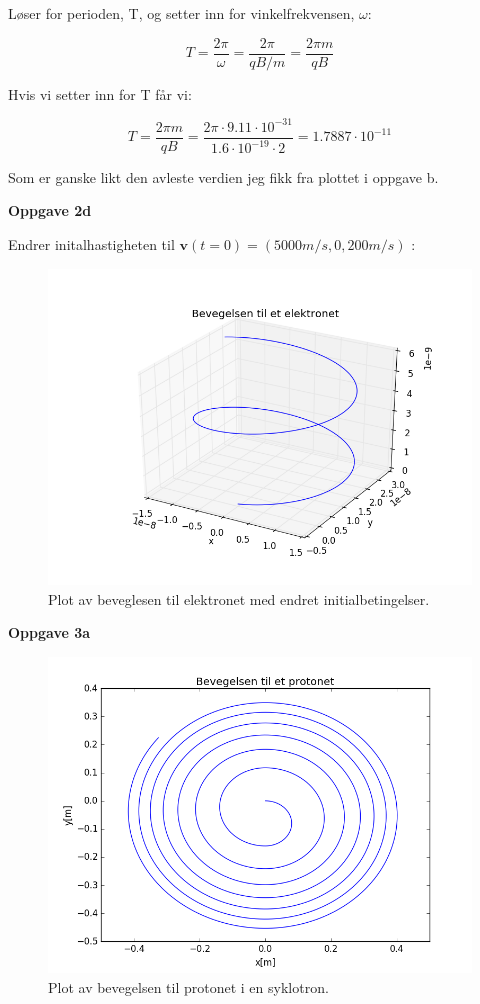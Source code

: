 \documentclass[a4paper,norsk,12pt]{article}
\begin{document}
Løser for perioden, T, og setter inn for vinkelfrekvensen, $\omega$:

$$ T = \dfrac{2 \pi}{\omega} = \dfrac{2 \pi}{{q B}/{m}} = \dfrac{2 \pi m}{{q B}}$$

Hvis vi setter inn for T får vi:

$$ T = \dfrac{2 \pi m}{{q B}} =  \dfrac{2 \pi \cdot 9.11 \cdot 10^{-31}}{{{1.6 \cdot 10^{-19}} \cdot 2}} = 1.7887 \cdot 10^{-11}$$

Som er ganske likt den avleste verdien jeg fikk fra plottet i oppgave b.

\hspace{1cm}

\textbf{Oppgave 2d}

Endrer initalhastigheten til $ \textbf{v}(t=0) = (5 000 m/s,0,200 m/s) $ :

\begin{figure}[H]
  \includegraphics[width=\linewidth]{oppgave25.png}
  \caption{Plot av beveglesen til elektronet med endret initialbetingelser.}
  \label{fig:plot5}
\end{figure}

\textbf{Oppgave 3a}

\begin{figure}[H]
  \includegraphics[width=\linewidth]{oppgave31.png}
  \caption{Plot av bevegelsen til protonet i en syklotron.}
  \label{fig:plot6}
\end{figure}
\end{document}
